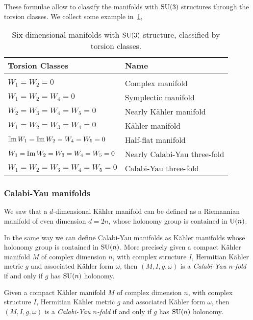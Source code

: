 \documentclass[debug]{phd}
\begin{document}
				These formulae allow to classify the manifolds with $\mathrm{SU}(3)$ structures through the torsion classes.
				We collect some example in~\cref{tabTorsCl},
						\begin{table}[h!]
						\centering
							\begin{tabular}{l | l}
								Torsion Classes						&			Name							\\
								\hline
																	&											\\[-.3mm]
								$W_1 = W_2 = 0$						& 			Complex manifold					\\[1.5mm]	
								$W_1 = W_2 = W_4 = 0$					&			Symplectic manifold					\\[1.5mm]	
								$W_2 = W_3 = W_4 = W_5 = 0$ 			&			Nearly K\"ahler	manifold				\\[1.5mm]
								$W_1 = W_2 = W_3 = W_4 = 0$			&			K\"ahler manifold					\\[1.5mm]	
								$\operatorname{\mathbb{I}m} W_1 = \operatorname{\mathbb{I}m} W_2 = W_4 = W_5 = 0$		&			Half-flat manifold					\\[1.5mm]
								$W_1 = \operatorname{\mathbb{I}m} W_2 = W_3 = W_4 = W_5 = 0$ 	&			Nearly Calabi-Yau three-fold			\\[1.5mm]	
								$W_1 = W_2 = W_3 = W_4 = W_5 = 0$ 		&			Calabi-Yau three-fold					
							\end{tabular}
							\caption{Six-dimensional manifolds with $\mathrm{SU}(3)$ structure, classified by torsion classes.}
							\label{tabTorsCl}
						\end{table}
				\subsubsection{Calabi-Yau manifolds}
					We saw that a $d$-dimensional K\"ahler manifold can be defined as a Riemannian manifold of even dimension $d=2n$, whose 
					holonomy group is contained in $\mathrm{U}(n)$.
					
					In the same way we can define Calabi-Yau manifolds as K\"ahler manifolds whose holonomy group is contained in $\mathrm{SU}(n)$. More precisely			
									given a compact K\"ahler manifold $M$ of complex dimension $n$, with complex structure $I$, Hermitian K\"ahler metric $g$ and associated K\"ahler form $\omega$, then $(M, I, g, \omega)$ is a \emph{Calabi-Yau $n$-fold} if and only if $g$ has $\mathrm{SU}(n)$ holonomy.
						
									Given a compact K\"ahler manifold $M$ of complex dimension $n$, with complex structure $I$, Hermitian K\"ahler metric $g$ and associated K\"ahler form $\omega$, then $(M, I, g, \omega)$ is a \emph{Calabi-Yau $n$-fold} if and only if $g$ has $\mathrm{SU}(n)$ holonomy.
					
\end{document}
